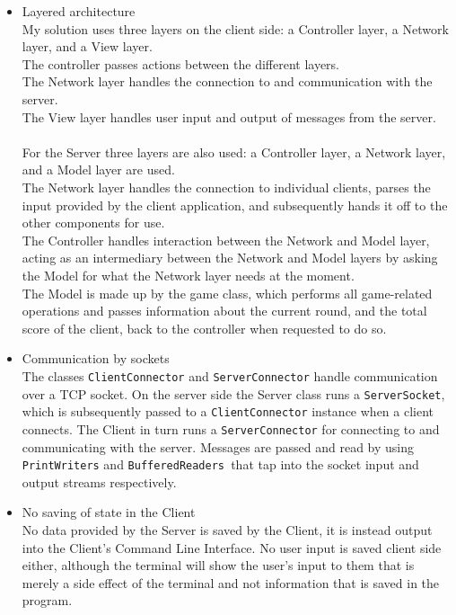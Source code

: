 \documentclass[a4paper]{scrartcl}
\begin{document}
\begin{itemize}
	\item{
		Layered architecture\\
		My solution uses three layers on the client side: a Controller layer, a Network layer, and a View layer.\\
		The controller passes actions between the different layers.\\
		The Network layer handles the connection to and communication with the server.\\
		The View layer handles user input and output of messages from the server.\\
		\\
		For the Server three layers are also used: a Controller layer, a Network layer, and a Model layer are used.\\
		The Network layer handles the connection to individual clients, parses the input provided by the client application, and subsequently hands it off to the other components for use.\\
		The Controller handles interaction between the Network and Model layer, acting as an intermediary between the Network and Model layers by asking the Model for what the Network layer needs at the moment.\\
		The Model is made up by the game class, which performs all game-related operations and passes information about the current round, and the total score of the client, back to the controller when requested to do so.
	}
	\item{
		Communication by sockets\\
		The classes \texttt{ClientConnector} and \texttt{ServerConnector} handle communication over a TCP socket. On the server side the Server class runs a \texttt{ServerSocket}, which is subsequently passed to a \texttt{ClientConnector} instance when a client connects. The Client in turn runs a \texttt{ServerConnector} for connecting to and communicating with the server. Messages are passed and read by using \texttt{PrintWriters} and \texttt{BufferedReaders }that tap into the socket input and output streams respectively.
	}
	\item{
		No saving of state in the Client\\
		No data provided by the Server is saved by the Client, it is instead output into the Client’s Command Line Interface. No user input is saved client side either, although the terminal will show the user’s input to them that is merely a side effect of the terminal and not information that is saved in the program.
}
\end{itemize}
\end{document}
